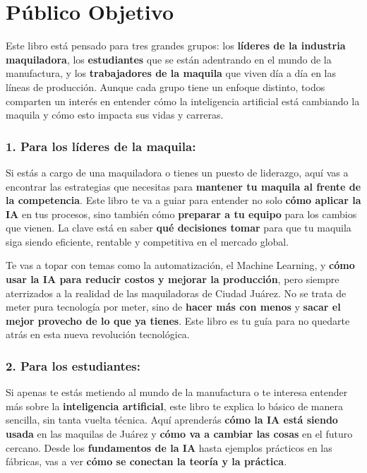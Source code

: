 \documentclass[
  10pt,
  letterpaper,
]{book}
\begin{document}
\section*{Público Objetivo}\label{puxfablico-objetivo}


Este libro está pensado para tres grandes grupos: los \textbf{líderes de
la industria maquiladora}, los \textbf{estudiantes} que se están
adentrando en el mundo de la manufactura, y los \textbf{trabajadores de
la maquila} que viven día a día en las líneas de producción. Aunque cada
grupo tiene un enfoque distinto, todos comparten un interés en entender
cómo la inteligencia artificial está cambiando la maquila y cómo esto
impacta sus vidas y carreras.

\subsubsection*{1. Para los líderes de la
maquila:}\label{para-los-luxedderes-de-la-maquila}

Si estás a cargo de una maquiladora o tienes un puesto de liderazgo,
aquí vas a encontrar las estrategias que necesitas para \textbf{mantener
tu maquila al frente de la competencia}. Este libro te va a guiar para
entender no solo \textbf{cómo aplicar la IA} en tus procesos, sino
también cómo \textbf{preparar a tu equipo} para los cambios que vienen.
La clave está en saber \textbf{qué decisiones tomar} para que tu maquila
siga siendo eficiente, rentable y competitiva en el mercado global.

Te vas a topar con temas como la automatización, el Machine Learning, y
\textbf{cómo usar la IA para reducir costos y mejorar la producción},
pero siempre aterrizados a la realidad de las maquiladoras de Ciudad
Juárez. No se trata de meter pura tecnología por meter, sino de
\textbf{hacer más con menos} y \textbf{sacar el mejor provecho de lo que
ya tienes}. Este libro es tu guía para no quedarte atrás en esta nueva
revolución tecnológica.

\subsubsection*{2. Para los estudiantes:}\label{para-los-estudiantes}

Si apenas te estás metiendo al mundo de la manufactura o te interesa
entender más sobre la \textbf{inteligencia artificial}, este libro te
explica lo básico de manera sencilla, sin tanta vuelta técnica. Aquí
aprenderás \textbf{cómo la IA está siendo usada} en las maquilas de
Juárez y \textbf{cómo va a cambiar las cosas} en el futuro cercano.
Desde los \textbf{fundamentos de la IA} hasta ejemplos prácticos en las
fábricas, vas a ver \textbf{cómo se conectan la teoría y la práctica}.
\end{document}
